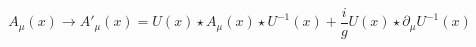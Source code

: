 \begin{equation} A_{\mu}(x)\rightarrow
A'_{\mu}(x)=U(x)\star A_{\mu}(x)\star
U^{-1}(x)+\frac{i}{g}U(x)\star
\partial_{\mu}U^{-1}(x)
\end{equation}

